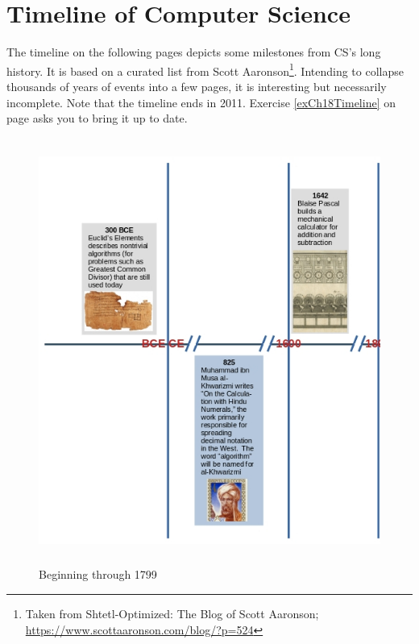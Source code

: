 
\chapter{Timeline of Computer Science}\label{appendixTimeline}

The timeline on the following pages depicts some milestones from CS's long history. It is based on a curated list from Scott Aaronson\footnote{Taken from Shtetl-Optimized: The Blog of Scott Aaronson; \url{https://www.scottaaronson.com/blog/?p=524}}. Intending to collapse thousands of years of events into a few pages, it is interesting but necessarily incomplete. Note that the timeline ends in 2011. Exercise \ref{exCh18Timeline} on page \pageref{exCh18Timeline} asks you to bring it up to date.

\begin{figure}[H]
	\begin{center}
		\caption{Beginning through 1799}
		\vskip 4pt
		\includegraphics[height=5.5in]{cs-timeline/CSHistoryTimeline-Part1a.jpg}
	\end{center}
\end{figure}

